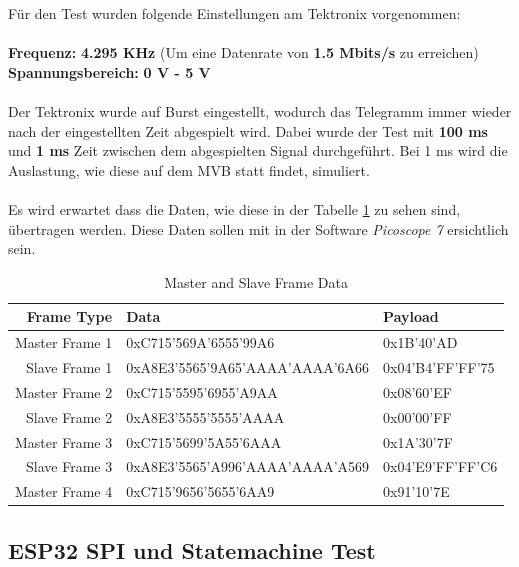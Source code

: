Für den Test wurden folgende Einstellungen am Tektronix vorgenommen:\\
\\
\textbf{Frequenz:}\hspace{1.87cm} \textbf{4.295 KHz} (Um eine Datenrate von \textbf{1.5 Mbits/s} zu erreichen)\\
\textbf{Spannungsbereich:}\hspace{0.25cm} \textbf{0 V - 5 V}\\
\\
Der Tektronix wurde auf Burst eingestellt, wodurch das Telegramm immer wieder nach der eingestellten Zeit abgespielt wird.
Dabei wurde der Test mit \textbf{100 ms} und \textbf{1 ms} Zeit zwischen dem abgespielten Signal durchgeführt. Bei 1 ms wird die Auslastung, wie diese auf dem MVB statt findet,
simuliert.\\
\\
Es wird erwartet dass die Daten, wie diese in der Tabelle \ref{tab:frame_data} zu sehen sind, übertragen werden. Diese Daten sollen mit in der Software \textit{Picoscope 7} ersichtlich sein.

\begin{table}[h!]
    \centering
    \begin{tabular}{r||l||l}
        \toprule
        \textbf{Frame Type} & \textbf{Data}  & \textbf{Payload} \\ 
        \midrule
        Master Frame 1 & 0xC715’569A’6555’99A6 & 0x1B'40'AD \\
        Slave Frame 1  & 0xA8E3’5565’9A65’AAAA’AAAA’6A66 & 0x04'B4'FF'FF'75 \\
        \midrule
        Master Frame 2 & 0xC715’5595’6955’A9AA & 0x08'60'EF \\
        Slave Frame 2  & 0xA8E3’5555’5555’AAAA & 0x00'00'FF\\
        \midrule
        Master Frame 3 & 0xC715’5699’5A55’6AAA & 0x1A'30'7F \\
        Slave Frame 3  & 0xA8E3’5565’A996’AAAA’AAAA’A569 & 0x04'E9'FF'FF'C6 \\
        \midrule
        Master Frame 4 & 0xC715’9656’5655’6AA9 & 0x91'10'7E\\
        \bottomrule
    \end{tabular}
    \caption{Master and Slave Frame Data}
    \label{tab:frame_data}
\end{table}




\subsection{ESP32 SPI und Statemachine Test}
\label{sub:ESPSPIundFSMTest}

